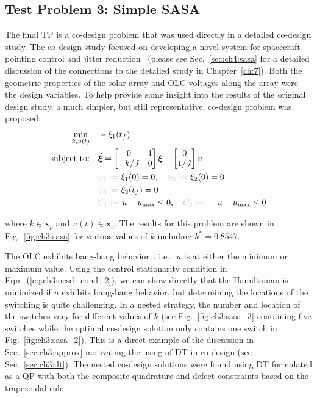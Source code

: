 \subsection{Test Problem 3: Simple SASA}

The final TP is a co-design problem that was used directly in a detailed co-design study.
The co-design study focused on developing a novel  system for spacecraft pointing control and jitter reduction~\cite{Chilan2017a} (please see Sec.~\ref{sec:ch4:sasa} for a detailed discussion of the connections to the detailed study in Chapter~\ref{ch:7}). Both the geometric properties of the solar array and OLC voltages along the array were the design variables.
To help provide some insight into the results of the original design study, a much simpler, but still representative, co-design problem was proposed:
\begin{subequations}
\label{eq:ch3:sasa_prob2}
\begin{align}
\min_{k,u(t)} \quad & - \xi_1(t_f) \\
\text{subject to:} \quad & \dot{\bm{\xi}} = \begin{bmatrix} 0 & 1 \\ -k/J & 0 \end{bmatrix} \bm{\xi} + \begin{bmatrix} 0 \\ 1/J \end{bmatrix} u \\
& \textcolor{light-gray}{\phi_1 := }\ \xi_1(0) = 0, \quad \textcolor{light-gray}{\phi_2 := }\  \xi_2(0) = 0 \\
& \textcolor{light-gray}{\phi_3 := }\  \xi_2(t_f) = 0 \\ 
& \textcolor{light-gray}{C_1 := }\  u - u_{\max} \leq 0, \quad \textcolor{light-gray}{C_2 := }\ -u - u_{\max} \leq 0
\end{align}
\end{subequations}



\noindent where $k \in \bm{x}_p$  and $u(t) \in \bm{x}_c$. The results for this problem are shown in Fig.~\ref{fig:ch3:sasa} for various values of $k$ including $k^* = 0.8547$.

The OLC exhibits bang-bang behavior~\cite{Bryson1975a, Liberzon2012a}, i.e.,~$u$ is at either the minimum or maximum value. 
Using the control stationarity condition in Eqn.~(\ref{eq:ch3:ocsd_cond_2}), we can show directly that the Hamiltonian is minimized if $u$ exhibits bang-bang behavior, but determining the locations of the switching is quite challenging.
In a nested strategy, the number and location of the switches vary for different values of $k$ (see Fig.~\ref{fig:ch3:sasa_3} containing five switches while the optimal co-design solution only contains one switch in Fig.~\ref{fig:ch3:sasa_2}). This is a direct example of the discussion in Sec.~\ref{sec:ch3:approx} motivating the using of DT in co-design (see Sec.~\ref{sec:ch3:dt}).
The nested co-design solutions were found using DT formulated as a QP with both the composite quadrature and defect constraints based on the trapezoidal rule~\cite{Biegler2010a, Betts2010a, Herber2014a}.

